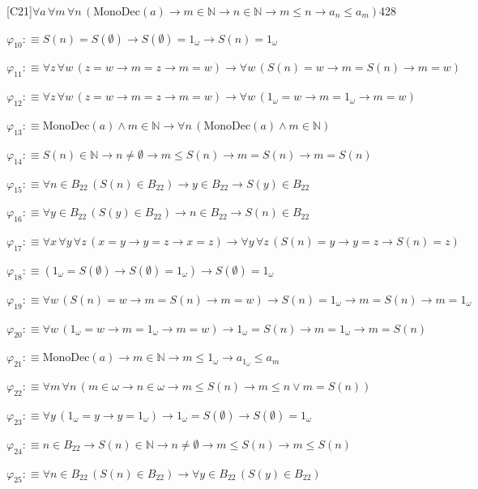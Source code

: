 \begin{fullproof}{[C21]}{$\forall a\,\forall m\,\forall n\,(\mathrm{MonoDec}(a) \to m \in \mathbb{N} \to n \in \mathbb{N} \to m \leq n \to a_{n} \leq a_{m})$}{428}
\begin{abbrevlist}
\item $\varphi_{10} :\equiv S(n) = S(\emptyset) \to S(\emptyset) = 1_{\omega} \to S(n) = 1_{\omega}$
\item $\varphi_{11} :\equiv \forall z\,\forall w\,(z = w \to m = z \to m = w) \to \forall w\,(S(n) = w \to m = S(n) \to m = w)$
\item $\varphi_{12} :\equiv \forall z\,\forall w\,(z = w \to m = z \to m = w) \to \forall w\,(1_{\omega} = w \to m = 1_{\omega} \to m = w)$
\item $\varphi_{13} :\equiv \mathrm{MonoDec}(a) \land m \in \mathbb{N} \to \forall n\,(\mathrm{MonoDec}(a) \land m \in \mathbb{N})$
\item $\varphi_{14} :\equiv S(n) \in \mathbb{N} \to n \neq \emptyset \to m \leq S(n) \to m = S(n) \to m = S(n)$
\item $\varphi_{15} :\equiv \forall n \in B_{22}\,(S(n) \in B_{22}) \to y \in B_{22} \to S(y) \in B_{22}$
\item $\varphi_{16} :\equiv \forall y \in B_{22}\,(S(y) \in B_{22}) \to n \in B_{22} \to S(n) \in B_{22}$
\item $\varphi_{17} :\equiv \forall x\,\forall y\,\forall z\,(x = y \to y = z \to x = z) \to \forall y\,\forall z\,(S(n) = y \to y = z \to S(n) = z)$
\item $\varphi_{18} :\equiv (1_{\omega} = S(\emptyset) \to S(\emptyset) = 1_{\omega}) \to S(\emptyset) = 1_{\omega}$
\item $\varphi_{19} :\equiv \forall w\,(S(n) = w \to m = S(n) \to m = w) \to S(n) = 1_{\omega} \to m = S(n) \to m = 1_{\omega}$
\item $\varphi_{20} :\equiv \forall w\,(1_{\omega} = w \to m = 1_{\omega} \to m = w) \to 1_{\omega} = S(n) \to m = 1_{\omega} \to m = S(n)$
\item $\varphi_{21} :\equiv \mathrm{MonoDec}(a) \to m \in \mathbb{N} \to m \leq 1_{\omega} \to a_{1_{\omega}} \leq a_{m}$
\item $\varphi_{22} :\equiv \forall m\,\forall n\,(m \in \omega \to n \in \omega \to m \leq S(n) \to m \leq n \lor m = S(n))$
\item $\varphi_{23} :\equiv \forall y\,(1_{\omega} = y \to y = 1_{\omega}) \to 1_{\omega} = S(\emptyset) \to S(\emptyset) = 1_{\omega}$
\item $\varphi_{24} :\equiv n \in B_{22} \to S(n) \in \mathbb{N} \to n \neq \emptyset \to m \leq S(n) \to m \leq S(n)$
\item $\varphi_{25} :\equiv \forall n \in B_{22}\,(S(n) \in B_{22}) \to \forall y \in B_{22}\,(S(y) \in B_{22})$

\end{abbrevlist}
\end{fullproof}
